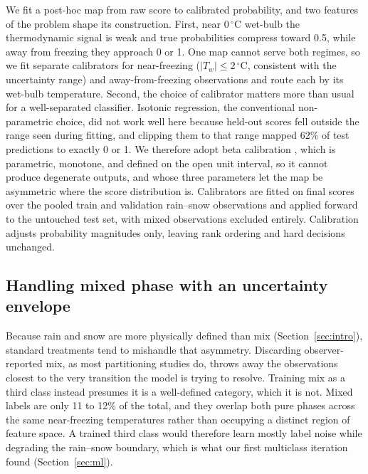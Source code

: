 \documentclass[twocol]{ametsocV6.1} %
\newcommand{\degC}[1]{\ensuremath{#1\,^{\circ}\mathrm{C}}}
\begin{document}
We fit a post-hoc map from raw score to calibrated
probability, and two features of the problem shape its construction.
First, near \degC{0} wet-bulb the thermodynamic signal is weak and true
probabilities compress toward 0.5, while away from freezing they
approach 0 or 1. One map cannot serve both regimes, so we fit separate
calibrators for near-freezing ($|T_w| \le \degC{2}$, consistent with the
\citealt{sims2015} uncertainty range) and away-from-freezing
observations and route each by its wet-bulb temperature. 
Second, the choice of calibrator matters more than usual for a
well-separated classifier. Isotonic regression, the conventional
non-parametric choice, did not work well here because held-out scores fell outside
the range seen during fitting, and clipping them to that range mapped
62\% of test predictions to exactly 0 or 1. 
We therefore adopt beta calibration \citep{kull2017}, which
is parametric, monotone, and defined on the open unit interval, so it
cannot produce degenerate outputs, and whose three parameters let the map
be asymmetric where the score distribution is. Calibrators are fitted on
final scores over the pooled train and validation rain--snow
observations and applied forward to the untouched test set, with mixed
observations excluded entirely. Calibration adjusts probability
magnitudes only, leaving rank ordering and hard decisions unchanged.

\subsection{Handling mixed phase with an uncertainty envelope}
\label{sec:mix}
Because rain and snow are more physically defined than mix
(Section~\ref{sec:intro}), standard treatments tend to mishandle that
asymmetry. Discarding observer-reported mix, as most partitioning
studies do, throws away the observations closest to the very transition
the model is trying to resolve. Training mix as a third class instead
presumes it is a well-defined category, which it is not. Mixed labels
are only 11 to 12\% of the total, and they overlap both pure phases across
the same near-freezing temperatures rather than occupying a distinct
region of feature space. A trained third class would therefore learn mostly label
noise while degrading the rain--snow boundary, which is what our first
multiclass iteration found (Section~\ref{sec:ml}).
\end{document}
